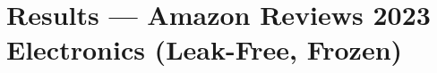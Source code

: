 
\section{Results --- Amazon Reviews 2023 Electronics (Leak-Free, Frozen)}
\label{sec:e23}
\mbox{}\par %


